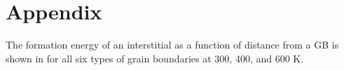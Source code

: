 \documentclass[review]{elsarticle}
\begin{document}





 \newpage
 
\section{Appendix}
\setcounter{figure}{0}
\setcounter{table}{0}
\renewcommand{\thefigure}{A\arabic{figure}}
\renewcommand{\thetable}{A\arabic{table}}
\setlength{\arrayrulewidth}{.5mm}
\setlength{\tabcolsep}{12pt}
\renewcommand{\arraystretch}{1.0}

The formation energy of an interstitial as a function of distance from a GB is shown in  for all six types of grain boundaries at 300, 400, and 600 K.
\end{document}
